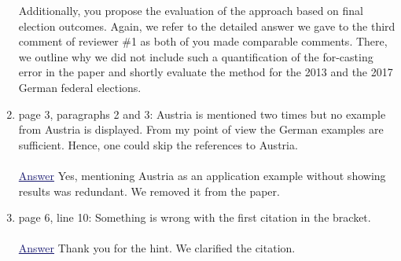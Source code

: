 \documentclass{scrartcl}
\newcommand{\blue}[1]{\textcolor{MidnightBlue}{\underline{\textcolor{MidnightBlue}{#1}}}}
\begin{document}
\begin{enumerate}
Additionally, you propose the evaluation of the approach based on final election outcomes. Again, we refer to the detailed answer we gave to the third comment of reviewer \#1 as both of you made comparable comments. There, we outline why we did not include such a quantification of the for-casting error in the paper and shortly evaluate the method for the 2013 and the 2017 German federal elections.

  \item page 3, paragraphs 2 and 3: Austria is  mentioned two times but no example from Austria is displayed. From my point of view the German examples are sufficient. Hence, one could skip the references to Austria.
  \\ \\
  \blue{Answer} Yes, mentioning Austria as an application example without showing results was redundant. We removed it from the paper.
  
  \item page 6, line 10: Something is wrong with the first citation in the bracket.
  \\ \\
  \blue{Answer} Thank you for the hint. We clarified the citation.
\end{enumerate}
\end{document}
